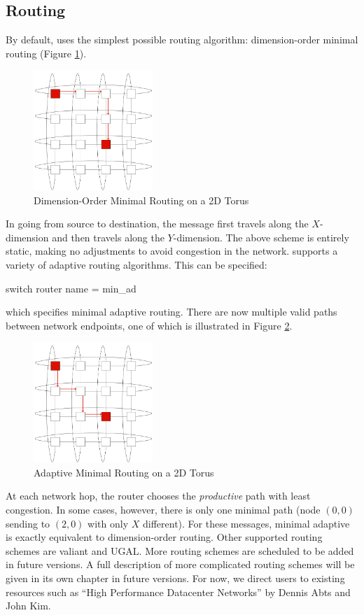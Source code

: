 \subsection{Routing}
\label{subsec:tutorial:routing}
By default, \sstmacro uses the simplest possible routing algorithm: dimension-order minimal routing (Figure \ref{fig:torus:basicrouting}).
\begin{figure}[h]
\centering
\includegraphics[width=0.4\textwidth]{figures/tikz/torus/minroutetorus.png}
\caption{Dimension-Order Minimal Routing on a 2D Torus}
\label{fig:torus:basicrouting}
\end{figure}
In going from source to destination, the message first travels along the $X$-dimension and then travels along the $Y$-dimension.
The above scheme is entirely static, making no adjustments to avoid congestion in the network.
\sstmacro supports a variety of adaptive routing algorithms.  This can be specified:

\begin{ViFile}
switch {
 router {
  name = min_ad
 }
}
\end{ViFile}
which specifies minimal adaptive routing. 
There are now multiple valid paths between network endpoints, one of which is illustrated in Figure \ref{fig:torus:minadrouting}.
\begin{figure}[h!]
\centering
\includegraphics[width=0.4\textwidth]{figures/tikz/torus/minadroutetorus.png}
\caption{Adaptive Minimal Routing on a 2D Torus}
\label{fig:torus:minadrouting}
\end{figure}
At each network hop, the router chooses the \emph{productive} path with least congestion.
In some cases, however, there is only one minimal path (node $(0,0)$ sending to $(2,0)$ with only $X$ different).
For these messages, minimal adaptive is exactly equivalent to dimension-order routing.
Other supported routing schemes are valiant and UGAL.  More routing schemes are scheduled to be added in future versions.  
A full description of more complicated routing schemes will be given in its own chapter in future versions. 
For now, we direct users to existing resources such as ``High Performance Datacenter Networks'' by Dennis Abts and John Kim.
